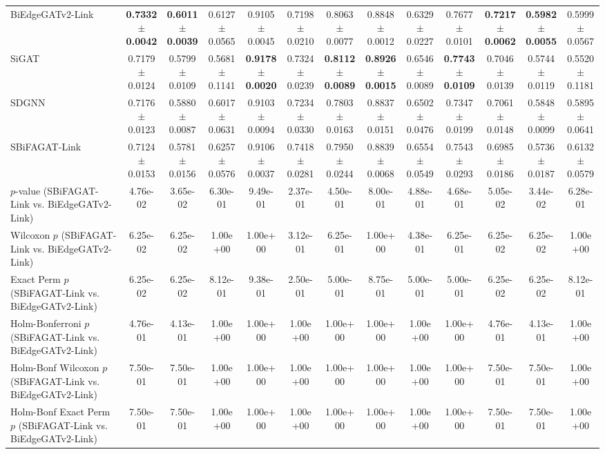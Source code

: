 \begin{table}[t]
{\begin{tabular}{lcccccccccccc}
BiEdgeGATv2-Link & \textbf{0.7332 $\pm$ 0.0042} & \textbf{0.6011 $\pm$ 0.0039} & 0.6127 $\pm$ 0.0565 & 0.9105 $\pm$ 0.0045 & 0.7198 $\pm$ 0.0210 & 0.8063 $\pm$ 0.0077 & 0.8848 $\pm$ 0.0012 & 0.6329 $\pm$ 0.0227 & 0.7677 $\pm$ 0.0101 & \textbf{0.7217 $\pm$ 0.0062} & \textbf{0.5982 $\pm$ 0.0055} & 0.5999 $\pm$ 0.0567 \\
SiGAT & 0.7179 $\pm$ 0.0124 & 0.5799 $\pm$ 0.0109 & 0.5681 $\pm$ 0.1141 & \textbf{0.9178 $\pm$ 0.0020} & 0.7324 $\pm$ 0.0239 & \textbf{0.8112 $\pm$ 0.0089} & \textbf{0.8926 $\pm$ 0.0015} & 0.6546 $\pm$ 0.0089 & \textbf{0.7743 $\pm$ 0.0109} & 0.7046 $\pm$ 0.0139 & 0.5744 $\pm$ 0.0119 & 0.5520 $\pm$ 0.1181 \\
SDGNN & 0.7176 $\pm$ 0.0123 & 0.5880 $\pm$ 0.0087 & 0.6017 $\pm$ 0.0631 & 0.9103 $\pm$ 0.0094 & 0.7234 $\pm$ 0.0330 & 0.7803 $\pm$ 0.0163 & 0.8837 $\pm$ 0.0151 & 0.6502 $\pm$ 0.0476 & 0.7347 $\pm$ 0.0199 & 0.7061 $\pm$ 0.0148 & 0.5848 $\pm$ 0.0099 & 0.5895 $\pm$ 0.0641 \\
SBiFAGAT-Link & 0.7124 $\pm$ 0.0153 & 0.5781 $\pm$ 0.0156 & 0.6257 $\pm$ 0.0576 & 0.9106 $\pm$ 0.0037 & 0.7418 $\pm$ 0.0281 & 0.7950 $\pm$ 0.0244 & 0.8839 $\pm$ 0.0068 & 0.6554 $\pm$ 0.0549 & 0.7543 $\pm$ 0.0293 & 0.6985 $\pm$ 0.0186 & 0.5736 $\pm$ 0.0187 & 0.6132 $\pm$ 0.0579 \\
\midrule
$p$-value (SBiFAGAT-Link vs. BiEdgeGATv2-Link) & 4.76e-02 & 3.65e-02 & 6.30e-01 & 9.49e-01 & 2.37e-01 & 4.50e-01 & 8.00e-01 & 4.88e-01 & 4.68e-01 & 5.05e-02 & 3.44e-02 & 6.28e-01 \\
Wilcoxon $p$ (SBiFAGAT-Link vs. BiEdgeGATv2-Link) & 6.25e-02 & 6.25e-02 & 1.00e+00 & 1.00e+00 & 3.12e-01 & 6.25e-01 & 1.00e+00 & 4.38e-01 & 6.25e-01 & 6.25e-02 & 6.25e-02 & 1.00e+00 \\
Exact Perm $p$ (SBiFAGAT-Link vs. BiEdgeGATv2-Link) & 6.25e-02 & 6.25e-02 & 8.12e-01 & 9.38e-01 & 2.50e-01 & 5.00e-01 & 8.75e-01 & 5.00e-01 & 5.00e-01 & 6.25e-02 & 6.25e-02 & 8.12e-01 \\
Holm-Bonferroni $p$ (SBiFAGAT-Link vs. BiEdgeGATv2-Link) & 4.76e-01 & 4.13e-01 & 1.00e+00 & 1.00e+00 & 1.00e+00 & 1.00e+00 & 1.00e+00 & 1.00e+00 & 1.00e+00 & 4.76e-01 & 4.13e-01 & 1.00e+00 \\
Holm-Bonf Wilcoxon $p$ (SBiFAGAT-Link vs. BiEdgeGATv2-Link) & 7.50e-01 & 7.50e-01 & 1.00e+00 & 1.00e+00 & 1.00e+00 & 1.00e+00 & 1.00e+00 & 1.00e+00 & 1.00e+00 & 7.50e-01 & 7.50e-01 & 1.00e+00 \\
Holm-Bonf Exact Perm $p$ (SBiFAGAT-Link vs. BiEdgeGATv2-Link) & 7.50e-01 & 7.50e-01 & 1.00e+00 & 1.00e+00 & 1.00e+00 & 1.00e+00 & 1.00e+00 & 1.00e+00 & 1.00e+00 & 7.50e-01 & 7.50e-01 & 1.00e+00 \\
\bottomrule
\end{tabular}
}
\end{table}
